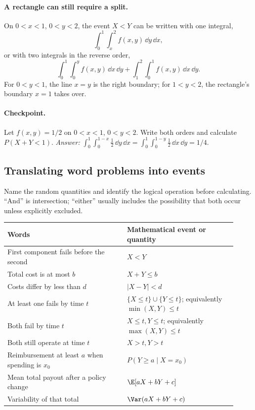 \paragraph{A rectangle can still require a split.} On $0<x<1$, $0<y<2$, the event $X<Y$ can be written with one integral,
\[
 \int_0^1\int_x^2 f(x,y)\,\dd y\,\dd x,
\]
or with two integrals in the reverse order,
\[
 \int_0^1\int_0^y f(x,y)\,\dd x\,\dd y
 +\int_1^2\int_0^1 f(x,y)\,\dd x\,\dd y.
\]
For $0<y<1$, the line $x=y$ is the right boundary; for $1<y<2$, the rectangle's boundary $x=1$ takes over.

\paragraph{Checkpoint.} Let $f(x,y)=1/2$ on $0<x<1$, $0<y<2$. Write both orders and calculate $P(X+Y<1)$. \emph{Answer:} $\int_0^1\int_0^{1-x}\tfrac12\,\dd y\,\dd x=\int_0^1\int_0^{1-y}\tfrac12\,\dd x\,\dd y=1/4$.

\subsection{Translating word problems into events}

Name the random quantities and identify the logical operation before calculating. ``And'' is intersection; ``either'' usually includes the possibility that both occur unless explicitly excluded.

\begin{center}
\begin{tabular}{@{}p{0.48\linewidth}p{0.44\linewidth}@{}}
\toprule
Words & Mathematical event or quantity\\
\midrule
First component fails before the second & $X<Y$\\
Total cost is at most $b$ & $X+Y\leq b$\\
Costs differ by less than $d$ & $|X-Y|<d$\\
At least one fails by time $t$ & $\{X\leq t\}\cup\{Y\leq t\}$; equivalently $\min(X,Y)\leq t$\\
Both fail by time $t$ & $X\leq t,Y\leq t$; equivalently $\max(X,Y)\leq t$\\
Both still operate at time $t$ & $X>t,Y>t$\\
Reimbursement at least $a$ when spending is $x_0$ & $P(Y\geq a\mid X=x_0)$\\
Mean total payout after a policy change & $\E[aX+bY+c]$\\
Variability of that total & $\Var(aX+bY+c)$\\
\bottomrule
\end{tabular}
\end{center}

